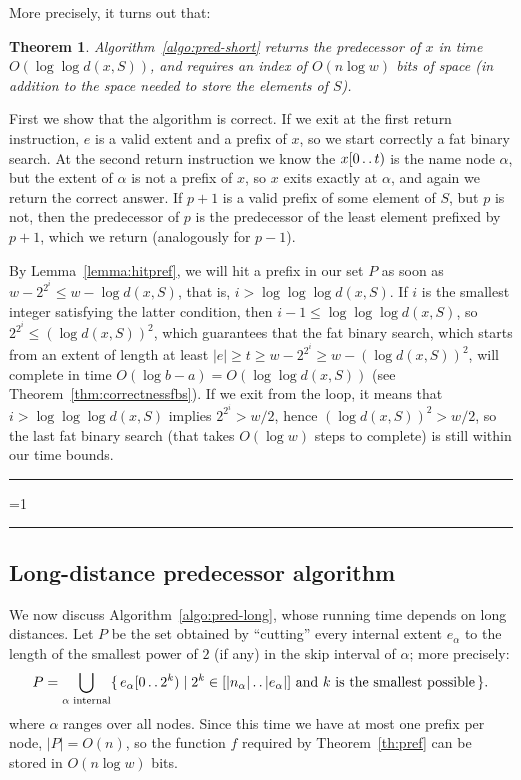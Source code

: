 \documentclass{article}
\newtheorem{theorem}{Theorem}
\newcounter{noqed}
\newcommand{\qed}{ \ifmmode\mbox{ }\fi\rule[-.05em]{.3em}{.7em}\setcounter{noqed}{0}}
\newenvironment{proof}[1][{}]{\noindent{\bf Proof#1. }\setcounter{noqed}{1}}{\ifnum\value{noqed}=1\qed\fi\par\medskip}
\newcommand{\?}{\mskip1.5mu}
\def\..{\,\mathpunct{\ldotp\ldotp}} %
\begin{document}
More precisely, it turns out that:
\begin{theorem}
Algorithm~\ref{algo:pred-short} returns the predecessor of $x$
in time $O(\log\log d(x,S))$, and requires an index of $O(n \log w )$
bits of space (in addition to the space needed to store the elements of $S$).
\end{theorem}
\begin{proof}
First we show that the algorithm is correct. If we exit at the first return
instruction, $e$ is a valid extent and a prefix of $x$, so we start correctly a
fat binary search. At the second return instruction we know the $x[0\..t)$ is
the name node $\alpha$, but the extent of $\alpha$ is not a prefix of $x$, so
$x$ exits exactly at $\alpha$, and again we return the correct answer. If $p+1$ is a valid prefix of some element of $S$, but $p$ is not, then the predecessor
of $p$ is the predecessor of the least element prefixed by $p+1$, which we
return (analogously for $p-1$).

By Lemma~\ref{lemma:hitpref}, we will hit a prefix in our set $P$ as soon as
$w-2^{2^i}\leq w-\log d(x,S)$, that is, $i>\log\log\log d(x,S)$. If $i$ is the
smallest integer satisfying the latter condition, then $i-1\leq \log\log\log
d(x,S)$, so $2^{2^i}\leq (\log d(x,S))^2$, which guarantees that the fat binary
search, which starts from an extent of length at least $|e| \geq t \geq
w-2^{2^i} \geq w-(\log d(x,S))^2$, will complete in time $O(\log
b-a)=O(\log\log d(x,S))$ (see Theorem~\ref{thm:correctnessfbs}). If we exit from the loop,
it means that $i>\log\log\log d(x,S)$ implies $2^{2^i}>w/2$, hence
$(\log d(x,S))^2>w/2$, so the last fat binary search (that takes $O(\log w)$
steps to complete) is still within our time bounds.\qed
\end{proof}

\subsection{Long-distance predecessor algorithm}
\label{sec:long}

We now discuss Algorithm~\ref{algo:pred-long}, whose running time depends on long
distances. Let $P$ be the set obtained by ``cutting''
every internal extent $e_\alpha$ to the length of the smallest power of $2$ (if
any) in the skip interval of $\alpha$; more precisely:
\[
	P=\bigcup_\text{$\alpha$ internal}\{\,e_\alpha[0\..2^k) \mid 2^k \in
	[|n_\alpha|\..|e_\alpha|] \text{ and $k$ is the smallest possible}\,\}.
\]
where $\alpha$ ranges over all nodes. Since this time we
have at most one prefix per node, $|P|=O(n)$, so the function $f$ required by
Theorem~\ref{th:pref} can be stored in $O(n\log w)$ bits. 
\end{document}
